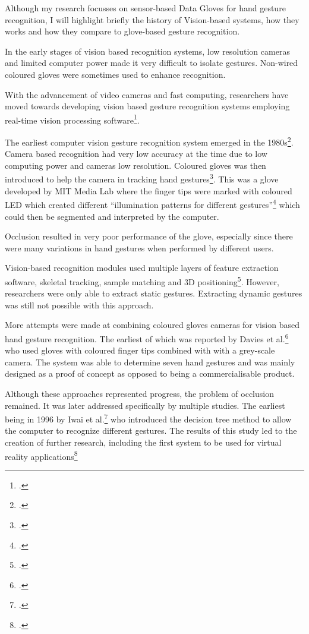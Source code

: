 Although my research focusses on sensor-based Data Gloves for hand gesture recognition, I will highlight briefly the history of Vision-based systems, how they works and how they compare to glove-based gesture recognition.

In the early stages of vision based recognition systems, low resolution cameras and limited computer power made it very difficult to isolate gestures. Non-wired coloured gloves were sometimes used to enhance recognition.

With the advancement of video cameras and fast computing, researchers have moved towards developing vision based gesture recognition systems employing real-time vision processing software\footcite{Pavlovic1997}.

The earliest computer vision gesture recognition system emerged in the 1980s\footcite{Premaratne2010}. Camera based recognition had very low accuracy at the time due to low computing power and cameras low resolution. Coloured gloves was then introduced to help the camera in tracking hand gestures\footcite{James1994}. This was a glove developed by MIT Media Lab where the finger tips were marked with coloured LED which created different ``illumination patterns for different gestures''\footcite{Sturman1994} which could then be segmented and interpreted by the computer.

Occlusion resulted in very poor performance of the glove, especially since there were many variations in hand gestures when performed by different users.

Vision-based recognition modules used multiple layers of feature extraction software, skeletal tracking, sample matching and 3D positioning\footcite{Berci2007}. However, researchers were only able to extract static gestures. Extracting dynamic gestures was still not possible with this approach.

More attempts were made at combining coloured gloves cameras for vision based hand gesture recognition. The earliest of which was reported by Davies et al.\footcite{James1994} who used gloves with coloured finger tips combined with with a grey-scale camera. The system was able to determine seven hand gestures and was mainly designed as a proof of concept as opposed to being a commercialisable product.

Although these approaches represented progress, the problem of occlusion remained. It was later addressed specifically by multiple studies. The earliest being in 1996 by Iwai et al.\footcite{Iwai1996} who introduced the decision tree method to allow the computer to recognize different gestures. The results of this study led to the creation of further research, including the first system to be used for virtual reality applications\footcite{Wang2009}

